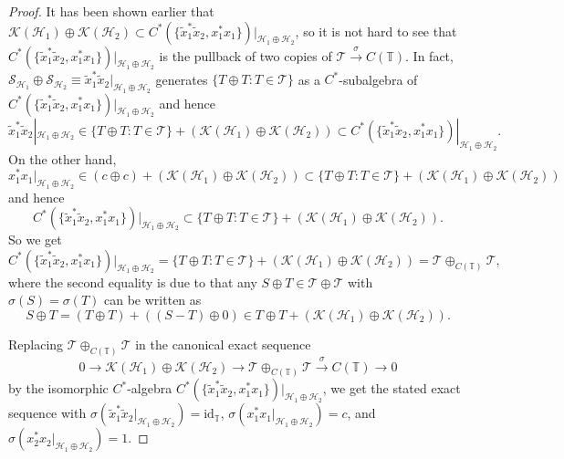 \documentclass[pdftex]{sigma}
\begin{document}
\begin{proof}
It has been shown earlier that $\mathcal{K}( \mathcal{H}_{1})
\oplus\mathcal{K}( \mathcal{H}_{2}) \subset C^{\ast}(
\{ \tilde{x}_{1}^{\ast}\tilde{x}_{2},x_{1}^{\ast}x_{1}\} )
|_{\mathcal{H}_{1}\oplus\mathcal{H}_{2}}$, so it is not hard to see that
$C^{\ast}( \{ \tilde{x}_{1}^{\ast}\tilde{x}_{2},x_{1}^{\ast}%
x_{1} \} ) |_{\mathcal{H}_{1}\oplus\mathcal{H}_{2}}$ is the
pullback of two copies of $\mathcal{T}\overset{\sigma}{\rightarrow}C(
\mathbb{T}) $. In fact, $\mathcal{S}_{\mathcal{H}_{1}}\oplus
\mathcal{S}_{\mathcal{H}_{2}}\equiv\tilde{x}_{1}^{\ast}\tilde{x}%
_{2}|_{\mathcal{H}_{1}\oplus\mathcal{H}_{2}}$ generates $ \{ T\oplus
T\colon T\in\mathcal{T} \} $ as a $C^*$-subalgebra of $C^{\ast}( \{
\tilde{x}_{1}^{\ast}\tilde{x}_{2},x_{1}^{\ast}x_{1} \} )
|_{\mathcal{H}_{1}\oplus\mathcal{H}_{2}}$ and hence%
\[
\tilde{x}_{1}^{\ast}\tilde{x}_{2}|_{\mathcal{H}_{1}\oplus\mathcal{H}_{2}}%
\in \{ T\oplus T\colon T\in\mathcal{T} \} +( \mathcal{K}(
\mathcal{H}_{1}) \oplus\mathcal{K}( \mathcal{H}_{2})
) \subset C^{\ast}( \{ \tilde{x}_{1}^{\ast}\tilde{x}%
_{2},x_{1}^{\ast}x_{1} \} ) |_{\mathcal{H}_{1}\oplus
\mathcal{H}_{2}}.
\]
On the other hand,
\[
x_{1}^{\ast}x_{1}|_{\mathcal{H}_{1}\oplus\mathcal{H}_{2}}\in( c\oplus
c) +( \mathcal{K}( \mathcal{H}_{1}) \oplus
\mathcal{K}( \mathcal{H}_{2}) ) \subset \{ T\oplus
T\colon T\in\mathcal{T} \} +( \mathcal{K}( \mathcal{H}_{1})
\oplus\mathcal{K}( \mathcal{H}_{2}) )
\]
and hence
\[
C^{\ast}( \{ \tilde{x}_{1}^{\ast}\tilde{x}_{2},x_{1}^{\ast}
x_{1} \} ) |_{\mathcal{H}_{1}\oplus\mathcal{H}_{2}}
\subset \{ T\oplus T\colon T\in\mathcal{T} \} +( \mathcal{K}(
\mathcal{H}_{1}) \oplus\mathcal{K}( \mathcal{H}_{2})) .
\]
So we get
\[
C^{\ast}( \{ \tilde{x}_{1}^{\ast}\tilde{x}_{2},x_{1}^{\ast}%
x_{1} \} ) |_{\mathcal{H}_{1}\oplus\mathcal{H}_{2}}= \{
T\oplus T\colon T\in\mathcal{T} \} +( \mathcal{K}( \mathcal{H}%
_{1}) \oplus\mathcal{K}( \mathcal{H}_{2}) )
=\mathcal{T}\oplus_{C(\mathbb{T}) }\mathcal{T},
\]
where the second equality is due to that any $S\oplus T\in\mathcal{T}%
\oplus\mathcal{T}$ with $\sigma( S) =\sigma(T) $
can be written as
\[
S\oplus T=( T\oplus T) +( ( S-T)
\oplus0) \in T\oplus T+( \mathcal{K}( \mathcal{H}
_{1}) \oplus\mathcal{K}( \mathcal{H}_{2}) ) .
\]

Replacing $\mathcal{T}\oplus_{C(\mathbb{T}) }\mathcal{T}$ in the
canonical exact sequence
\[
0\rightarrow\mathcal{K}( \mathcal{H}_{1}) \oplus\mathcal{K}%
( \mathcal{H}_{2}) \rightarrow\mathcal{T}\oplus_{C(
\mathbb{T}) }\mathcal{T}\overset{\sigma}{\rightarrow}C(
\mathbb{T}) \rightarrow0
\]
by the isomorphic $C^*$-algebra $C^{\ast}( \{ \tilde{x}_{1}^{\ast
}\tilde{x}_{2},x_{1}^{\ast}x_{1} \} ) |_{\mathcal{H}_{1}%
\oplus\mathcal{H}_{2}}$, we get the stated exact sequence with $\sigma(
\tilde{x}_{1}^{\ast}\tilde{x}_{2}|_{\mathcal{H}_{1}\oplus\mathcal{H}_{2}%
}) =\mathrm{id}_{\mathbb{T}}$, $\sigma( x_{1}^{\ast}%
x_{1}|_{\mathcal{H}_{1}\oplus\mathcal{H}_{2}}) =c$, and $\sigma(
x_{2}^{\ast}x_{2}|_{\mathcal{H}_{1}\oplus\mathcal{H}_{2}}) =1$.
\end{proof}
\end{document}
